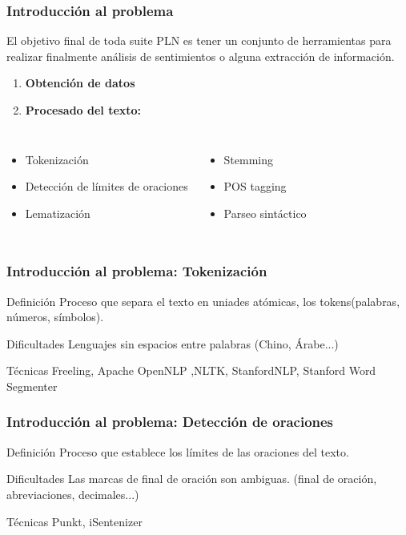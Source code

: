 \documentclass{beamer}
\begin{document}
\begin{frame}
\frametitle{Introducción al problema}
El objetivo final de toda suite PLN es tener un conjunto de herramientas para realizar finalmente análisis de sentimientos o alguna extracción de información.
\begin{enumerate}
\item \textbf{Obtención de datos}
\item \textbf{Procesado del texto:}
\end{enumerate}
\begin{columns}[c]
\begin{itemize}
\item Tokenización
\item Detección de límites de oraciones
\item Lematización
\end{itemize}
\begin{itemize}
\item Stemming
\item POS tagging
\item Parseo sintáctico
\end{itemize}
\end{columns}
\end{frame}

\begin{frame}
\frametitle{Introducción al problema: Tokenización}
\begin{block}{Definición}
Proceso que separa el texto en uniades atómicas, los tokens(palabras, números, símbolos).
\end{block}
\begin{block}{Dificultades}
Lenguajes sin espacios entre palabras (Chino, Árabe...)
\end{block}
\begin{block}{Técnicas}
Freeling, Apache OpenNLP ,NLTK, StanfordNLP, Stanford Word Segmenter
\end{block}
\end{frame}

\begin{frame}
\frametitle{Introducción al problema: Detección de oraciones}
\begin{block}{Definición}
Proceso que establece los límites de las oraciones del texto.
\end{block}
\begin{block}{Dificultades}
Las marcas de final de oración son ambiguas. (final de oración, abreviaciones, decimales...)
\end{block}
\begin{block}{Técnicas}
Punkt, iSentenizer
\end{block}
\end{frame}
\end{document}
